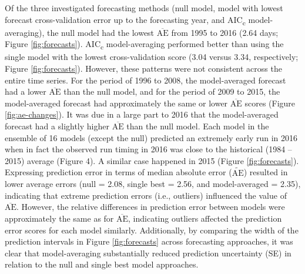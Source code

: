 \documentclass[12pt,]{book}
\theoremstyle{definition}
\theoremstyle{definition}
\theoremstyle{definition}
\theoremstyle{remark}
\begin{document}
\noindent
Of the three investigated forecasting methods (null model, model with
lowest forecast cross-validation error up to the forecasting year, and
AIC\textsubscript{c} model-averaging), the null model had the lowest
\(\overline{\text{AE}}\) from 1995 to 2016 (2.64 days; Figure
\ref{fig:forecasts}). AIC\textsubscript{c} model-averaging performed
better than using the single model with the lowest cross-validation
score (3.04 versus 3.34, respectively; Figure \ref{fig:forecasts}).
However, these patterns were not consistent across the entire time
series. For the period of 1996 to 2008, the model-averaged forecast had
a lower \(\overline{\text{AE}}\) than the null model, and for the period
of 2009 to 2015, the model-averaged forecast had approximately the same
or lower \(\overline{\text{AE}}\) scores (Figure \ref{fig:ae-changes}).
It was due in a large part to 2016 that the model-averaged forecast had
a slightly higher \(\overline{\text{AE}}\) than the null model. Each
model in the ensemble of 16 models (except the null) predicted an
extremely early run in 2016 when in fact the observed run timing in 2016
was close to the historical (1984 -- 2015) average (Figure 4). A similar
case happened in 2015 (Figure \ref{fig:forecasts}). Expressing
prediction error in terms of median absolute error
(\(\widetilde{\text{AE}}\)) resulted in lower average errors (null =
2.08, single best = 2.56, and model-averaged = 2.35), indicating that
extreme prediction errors (i.e., outliers) influenced the value of
\(\overline{\text{AE}}\). However, the relative differences in
prediction error between models were approximately the same as for
\(\overline{\text{AE}}\), indicating outliers affected the prediction
error scores for each model similarly. Additionally, by comparing the
width of the prediction intervals in Figure \ref{fig:forecasts} across
forecasting approaches, it was clear that model-averaging substantially
reduced prediction uncertainty (SE) in relation to the null and single
best model approaches.
\end{document}
